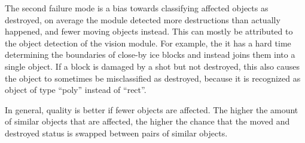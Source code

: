 The second failure mode is a bias towards classifying affected objects as destroyed, on average the module detected more destructions than actually happened, and fewer moving objects instead.
This can mostly be attributed to the object detection of the vision module.
For example, the it has a hard time determining the boundaries of close-by ice blocks and instead joins them into a single object. If a block is damaged by a shot but not destroyed, this also causes the object to sometimes be misclassified as destroyed, because it is recognized as object of type “poly” instead of “rect”.

In general, quality is better if fewer objects are affected. The higher the amount of similar objects that are affected, the higher the chance that the moved and destroyed status is swapped between pairs of similar objects.


